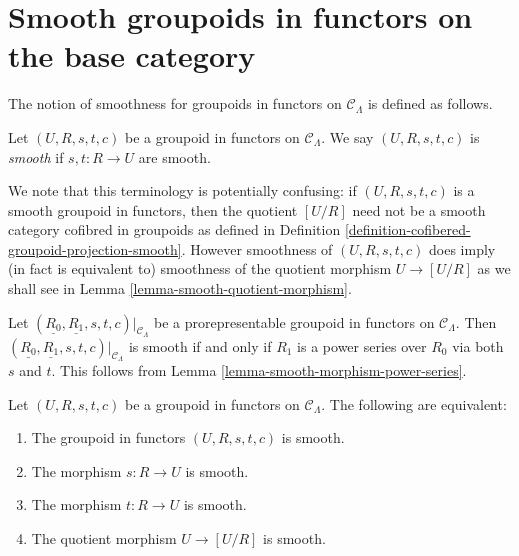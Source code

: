 \section{Smooth groupoids in functors on the base category}
\label{section-smooth-minimal-groupoids-in-functors}

\noindent
The notion of smoothness for groupoids in functors on $\mathcal{C}_\Lambda$ is
defined as follows.

\begin{definition}
\label{definition-smooth-groupoid-in-functors}
Let $(U, R, s, t, c)$ be a groupoid in functors on $\mathcal{C}_\Lambda$. We
say $(U, R, s, t, c)$ is {\it smooth} if $s, t: R \to U$ are smooth.
\end{definition}

\begin{remark}
\label{remark-smooth-groupoid-in-functors-warning}
We note that this terminology is potentially confusing:
if $(U, R, s, t, c)$ is a smooth groupoid in functors, then the quotient
$[U/R]$ need not be a smooth category cofibred in groupoids as defined in
Definition \ref{definition-cofibered-groupoid-projection-smooth}.
However smoothness of $(U, R, s, t, c)$ does imply (in fact is equivalent to)
smoothness of the quotient morphism $U \to [U/R]$ as we shall
see in
Lemma \ref{lemma-smooth-quotient-morphism}.
\end{remark}

\begin{remark}
\label{remark-smooth-power-series-prorepresentable-smooth-groupoid-in-functors}
Let $(\underline{R_0}, \underline{R_1}, s, t, c)|_{\mathcal{C}_\Lambda}$
be a prorepresentable groupoid in functors on $\mathcal{C}_\Lambda$.
Then $(\underline{R_0}, \underline{R_1}, s, t, c)|_{\mathcal{C}_\Lambda}$
is smooth if and only if $R_1$ is a power series over $R_0$ via both $s$
and $t$. This follows from
Lemma \ref{lemma-smooth-morphism-power-series}.
\end{remark}

\begin{lemma}
\label{lemma-smooth-quotient-morphism}
Let $(U, R, s, t, c)$ be a groupoid in functors on $\mathcal{C}_\Lambda$.
The following are equivalent:
\begin{enumerate}
\item The groupoid in functors $(U, R, s, t, c)$ is smooth.
\item The morphism $s : R \to U$ is smooth.
\item The morphism $t : R \to U$ is smooth.
\item The quotient morphism $U \to [U/R]$ is smooth.
\end{enumerate}
\end{lemma}

